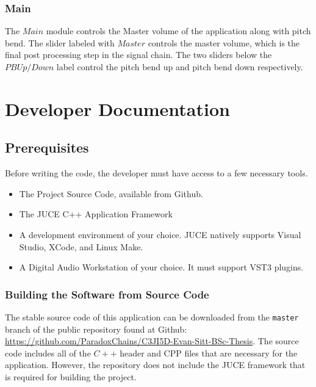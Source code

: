 \documentclass[a4paper,12pt]{report}
\begin{document}

\subsection{Main}
\label{subsec:main}
The $Main$ module controls the Master volume of the application along with pitch bend. The slider labeled with $Master$ controls the master volume, which is the final post processing step in the signal chain. The two sliders below the $PB Up/Down$ label control the pitch bend up and pitch bend down respectively.



\chapter{Developer Documentation}
\label{chapter:devdocs}

\section{Prerequisites}
\label{sec:prereq}
Before writing the code, the developer must have access to a few necessary tools.
\begin{itemize}
\item The Project Source Code, available from Github.
\item The JUCE C++ Application Framework
\item A development environment of your choice. JUCE natively supports Visual Studio, XCode, and Linux Make.
\item A Digital Audio Workstation of your choice. It must support VST3 plugins.
\end{itemize}
\subsection{Building the Software from Source Code}
\label{subsec:buildingasoftware}
The stable source code of this application can be downloaded from the \texttt{master} branch of the public repository found at Github: \href{https://github.com/ParadoxChains/C3JI5D-Evan-Sitt-BSc-Thesis}{https://github.com/ParadoxChains/C3JI5D-Evan-Sitt-BSc-Thesis}. The source code includes all of the $C++$ header and CPP files that are necessary for the application. However, the repository does not include the JUCE framework that is required for building the project.
\end{document}
